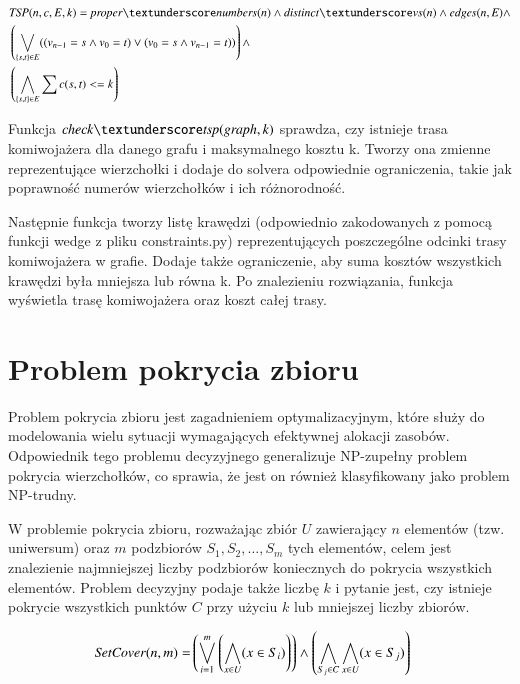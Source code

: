 \begin{align*}
	&\TSP(n, c, E, k) = \propernumbers \land \distinctvs \land \edges \land \\
	&\left( \bigvee_{\{s,t\} \in E} ((v_{n-1} = s \land v_0 = t) \lor (v_0 = s \land v_{n-1} = t)) \right) \land \\
	&\left( \bigwedge_{\{s,t\} \in E} \sum c(s,t) <= k \right)
\end{align*}

Funkcja $\checktsp$ sprawdza, czy istnieje trasa komiwojażera dla danego grafu i maksymalnego kosztu k. Tworzy ona zmienne reprezentujące wierzchołki i dodaje do solvera odpowiednie ograniczenia, takie jak poprawność numerów wierzchołków i ich różnorodność.

Następnie funkcja tworzy listę krawędzi (odpowiednio zakodowanych z pomocą funkcji wedge z pliku constraints.py) reprezentujących poszczególne odcinki trasy komiwojażera w grafie. Dodaje także ograniczenie, aby suma kosztów wszystkich krawędzi była mniejsza lub równa k. Po znalezieniu rozwiązania, funkcja wyświetla trasę komiwojażera oraz koszt całej trasy.



\section{Problem pokrycia zbioru}
Problem pokrycia zbioru jest zagadnieniem optymalizacyjnym, które służy do modelowania wielu sytuacji wymagających efektywnej alokacji zasobów. Odpowiednik tego problemu decyzyjnego generalizuje NP-zupełny problem pokrycia wierzchołków, co sprawia, że jest on również klasyfikowany jako problem NP-trudny.

W problemie pokrycia zbioru, rozważając zbiór \(U\) zawierający \(n\) elementów (tzw. uniwersum) oraz \(m\) podzbiorów $S_1, S_2, …, S_m$ tych elementów, celem jest znalezienie najmniejszej liczby podzbiorów koniecznych do pokrycia wszystkich elementów. Problem decyzyjny podaje także liczbę \(k\) i pytanie jest, czy istnieje pokrycie wszystkich punktów \(C\) przy użyciu \(k\) lub mniejszej liczby zbiorów.

\begin{align*}
	{\mathit{SetCover}}(n, m) = &\left( \bigvee_{i=1}^{m} \left( \bigwedge_{x\in U} (x \in S_i) \right) \right) \land 
	\left( \bigwedge_{S_j\in C} \bigwedge_{x\in U} (x \in S_j) \right)
\end{align*}


